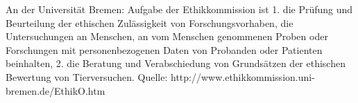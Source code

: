 \begin{frame}
An der Universität Bremen: Aufgabe der Ethikkommission ist
1.     die Prüfung und Beurteilung der ethischen Zulässigkeit von Forschungsvorhaben, die Untersuchungen an Menschen, an vom Menschen genommenen Proben oder Forschungen mit personenbezogenen Daten von Probanden oder Patienten beinhalten,
2.     die Beratung und Verabschiedung von Grundsätzen der ethischen Bewertung von Tierversuchen.
Quelle: http://www.ethikkommission.uni-bremen.de/EthikO.htm

\end{frame}



